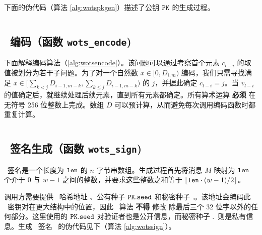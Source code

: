 下面的伪代码（算法 \ref{alg:wotspkgen}）描述了公钥 $\pk$ 的生成过程。

\begin{algorithm}
\inputminted[breaklines,linenos,tabsize=2,mathescape,escapeinside=||]{C}{paper/code/wots_PKgen.cs}
\caption{\texttt{wots\_PKgen} --- 生成 \WOTSCS\ 公钥。}
\label{alg:wotspkgen}
\end{algorithm}

\subsection{\WOTSCS\ 编码（函数 \texttt{wots\_encode})}

下面解释编码算法（\cref{alg:wotsencode}）。该问题可以通过考察首个元素 $c_{l-i}$ 的取值被划分为若干子问题。为了对一个自然数 $x\in [0,D_{i,m})$ 编码，我们只需寻找满足
$x\in [\sum_{k<j}D_{i-1,m-k},\sum_{k\leq j}D_{i-1,m-k})$
的 $j$，并据此确定 $c_{l-i}=j$。当 $v_{l-i}$ 的值确定后，就继续处理后续元素，直到所有元素都确定。所有算术运算 \textbf{必须} 在无符号 256 位整数上完成。数组 $D$ 可以预计算，从而避免每次调用编码函数时都重复计算。

\begin{algorithm}
\inputminted[breaklines,linenos,tabsize=2,mathescape,escapeinside=||]{C}{paper/code/wots_encode.cs}
\caption{\texttt{wots\_encode} --- 将消息编码为常和表示。}
\label{alg:wotsencode}
\end{algorithm}

\subsection{\WOTSCS\ 签名生成（函数 \texttt{wots\_sign})}

\WOTSCS\ 签名是一个长度为 $\mathtt{len}$ 的 $n$ 字节串数组。生成过程首先将消息 $M$ 映射为 $\mathtt{len}$ 个介于 $0$ 与 $w-1$ 之间的整数，并要求这些整数之和等于 $\lfloor {\ensuremath{\mathtt{len}}}\cdot (w-1)/2 \rfloor$。

调用方需要提供 \WOTSCS\ 哈希地址 \ADRS、公有种子 $\pk.\seed$ 和秘密种子 \sk.\seed。该地址会编码此 \WOTSCS\ 密钥对在更大结构中的位置，因此 \WOTSCS\ 算法 \textbf{不得} 修改 \ADRS 除最后三个 32 位字以外的任何部分。这里使用的 $\pk.\seed$ 对验证者也是公开信息，而秘密种子 \sk.\seed\ 则是私有信息。生成 \WOTSCS\ 签名 \sig\ 的伪代码见下（算法 \ref{alg:wotssign}）。

\begin{algorithm}
\inputminted[breaklines,linenos,tabsize=2,mathescape,escapeinside=||]{C}{paper/code/wots_sign.cs}
\caption{\texttt{wots\_sign} --- 对消息 $M$ 生成 \WOTSCS\ 签名。}
\label{alg:wotssign}
\end{algorithm}

